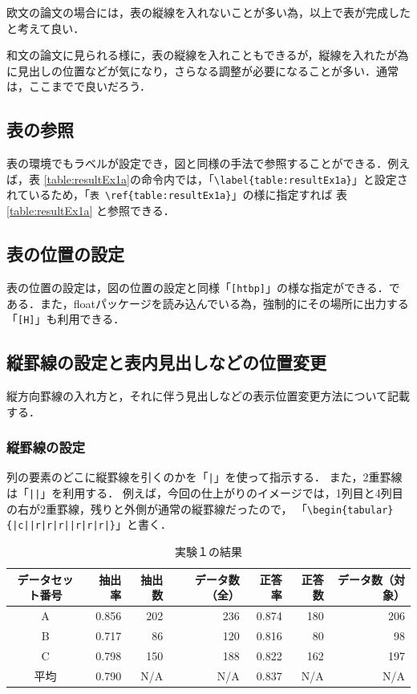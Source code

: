 欧文の論文の場合には，表の縦線を入れないことが多い為，以上で表が完成したと考えて良い．

和文の論文に見られる様に，表の縦線を入れこともできるが，縦線を入れたが為に見出しの位置などが気になり，さらなる調整が必要になることが多い．通常は，ここまでで良いだろう．

\subsection{表の参照}
表の環境でもラベルが設定でき，図と同様の手法で参照することができる．例えば，表 \ref{table:resultEx1a}の命令内では，「\verb+\label{table:resultEx1a}+」と設定されているため，「\verb+表 \ref{table:resultEx1a}+」の様に指定すれば 表 \ref{table:resultEx1a} と参照できる．

\subsection{表の位置の設定}
表の位置の設定は，図の位置の設定と同様「\verb+[htbp]+」の様な指定ができる．である．また，floatパッケージを読み込んでいる為，強制的にその場所に出力する「\verb+[H]+」も利用できる．

\subsection{縦罫線の設定と表内見出しなどの位置変更}
縦方向罫線の入れ方と，それに伴う見出しなどの表示位置変更方法について記載する．

\subsubsection{縦罫線の設定}
列の要素のどこに縦罫線を引くのかを「\verb+|+」を使って指示する．
また，2重罫線は「\verb+||+」を利用する．
例えば，今回の仕上がりのイメージでは，1列目と4列目の右が2重罫線，残りと外側が通常の縦罫線だったので，
「\verb+\begin{tabular}{|c||r|r|r||r|r|r|}+」と書く．
\begin{table}[H]
\caption{実験１の結果}
\centering
\begin{tabular}{|c||r|r|r||r|r|r|}
\hline
データセット番号 & 抽出率 & 抽出数 & データ数（全） & 正答率 & 正答数 & データ数（対象）\\ \hline \hline
A & 0.856 & 202 & 236 & 0.874 & 180 & 206\\ \hline
B & 0.717 & 86 & 120 & 0.816 & 80 & 98\\ \hline
C & 0.798 & 150 & 188 & 0.822 & 162 & 197\\ \hline \hline
平均 & 0.790 & N/A & N/A & 0.837 & N/A & N/A\\ \hline
\end{tabular}
\label{table:resultEx1d}
\end{table}

